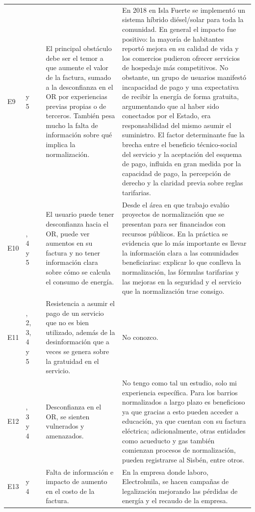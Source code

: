 \begin{longtable}{>{\centering}p{0.7cm}
                  >{\centering}p{2cm}
                  >{\centering}p{1.2cm}
                  >{\RaggedRight}p{3.5cm}
                  >{\RaggedRight\arraybackslash}p{5.0cm}}
E9  & 1 y 5 & 5 & El principal obstáculo debe ser el temor a que aumente el valor de la factura, sumado a la desconfianza en el OR por experiencias previas propias o de terceros. También pesa mucho la falta de información sobre qué implica la normalización. & En 2018 en Isla Fuerte se implementó un sistema híbrido diésel/solar para toda la comunidad. En general el impacto fue positivo: la mayoría de habitantes reportó mejora en su calidad de vida y los comercios pudieron ofrecer servicios de hospedaje más competitivos. No obstante, un grupo de usuarios manifestó incapacidad de pago y una expectativa de recibir la energía de forma gratuita, argumentando que al haber sido conectados por el Estado, era responsabilidad del mismo asumir el suministro. El factor determinante fue la brecha entre el beneficio técnico-social del servicio y la aceptación del esquema de pago, influida en gran medida por la capacidad de pago, la percepción de derecho y la claridad previa sobre reglas tarifarias. \\
\rowcolor{grisclaro}
E10 & 1, 4 y 5 & 5 & El usuario puede tener desconfianza hacia el OR, puede ver aumentos en su factura y no tener información clara sobre cómo se calcula el consumo de energía. & Desde el área en que trabajo evalúo proyectos de normalización que se presentan para ser financiados con recursos públicos. En la práctica se evidencia que lo más importante es llevar la información clara a las comunidades beneficiarias: explicar lo que conlleva la normalización, las fórmulas tarifarias y las mejoras en la seguridad y el servicio que la normalización trae consigo. \\
E11 & 1, 2, 3, 4 y 5 & 5 & Resistencia a asumir el pago de un servicio que no es bien utilizado, además de la desinformación que a veces se genera sobre la gratuidad en el servicio. & No conozco. \\
\rowcolor{grisclaro}
E12 & 2, 3 y 4 & 5 & Desconfianza en el OR, se sienten vulnerados y amenazados. & No tengo como tal un estudio, solo mi experiencia específica. Para los barrios normalizados a largo plazo es beneficioso ya que gracias a esto pueden acceder a educación, ya que cuentan con su factura eléctrica; adicionalmente, otras entidades como acueducto y gas también comienzan procesos de normalización, pueden registrarse al Sisbén, entre otros. \\
E13 & 1 y 4 & 5 & Falta de información e impacto de aumento en el costo de la factura. & En la empresa donde laboro, Electrohuila, se hacen campañas de legalización mejorando las pérdidas de energía y el recaudo de la empresa. \\

\end{longtable}
